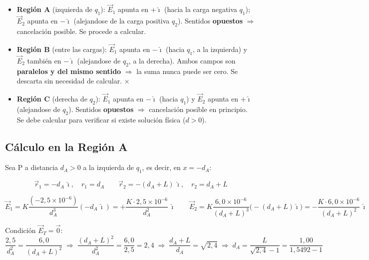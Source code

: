 \documentclass[12pt,letterpaper]{article}
\begin{document}
\begin{itemize}
    \item \textbf{Regi\'on A} (izquierda de $q_1$):
    $\vec{E}_1$ apunta en $+\hat{\imath}$ (hacia la carga negativa $q_1$);
    $\vec{E}_2$ apunta en $-\hat{\imath}$ (alejandose de la carga positiva $q_2$).
    Sentidos \textbf{opuestos} $\Rightarrow$ cancelaci\'on posible. Se procede a calcular.

    \item \textbf{Regi\'on B} (entre las cargas):
    $\vec{E}_1$ apunta en $-\hat{\imath}$ (hacia $q_1$, a la izquierda) y
    $\vec{E}_2$ tambi\'en en $-\hat{\imath}$ (alejandose de $q_2$, a la derecha).
    Ambos campos son \textbf{paralelos y del mismo sentido} $\Rightarrow$
    la suma nunca puede ser cero. Se descarta sin necesidad de calcular. $\times$

    \item \textbf{Regi\'on C} (derecha de $q_2$):
    $\vec{E}_1$ apunta en $-\hat{\imath}$ (hacia $q_1$) y
    $\vec{E}_2$ apunta en $+\hat{\imath}$ (alejandose de $q_2$).
    Sentidos \textbf{opuestos} $\Rightarrow$ cancelaci\'on posible en principio.
    Se debe calcular para verificar si existe soluci\'on f\'isica ($d>0$).
\end{itemize}

\subsection*{C\'alculo en la Regi\'on A}

Sea P a distancia $d_A > 0$ a la izquierda de $q_1$, es decir, en $x = -d_A$:

\[
    \vec{r}_1 = -d_A\,\hat{\imath},\quad r_1 = d_A \qquad
    \vec{r}_2 = -(d_A+L)\,\hat{\imath},\quad r_2 = d_A+L
\]

\[
    \vec{E}_1 = K\frac{(-2{,}5\times10^{-6})}{d_A^3}(-d_A\,\hat{\imath})
    = +\frac{K\cdot2{,}5\times10^{-6}}{d_A^2}\,\hat{\imath}
    \qquad
    \vec{E}_2 = K\frac{6{,}0\times10^{-6}}{(d_A+L)^3}\bigl(-(d_A+L)\hat{\imath}\bigr)
    = -\frac{K\cdot6{,}0\times10^{-6}}{(d_A+L)^2}\,\hat{\imath}
\]

Condici\'on $\vec{E}_T = \vec{0}$:
\[
    \frac{2{,}5}{d_A^2} = \frac{6{,}0}{(d_A+L)^2}
    \;\Rightarrow\;
    \frac{(d_A+L)^2}{d_A^2} = \frac{6{,}0}{2{,}5} = 2{,}4
    \;\Rightarrow\;
    \frac{d_A+L}{d_A} = \sqrt{2{,}4}
    \;\Rightarrow\;
    d_A = \frac{L}{\sqrt{2{,}4}-1} = \frac{1{,}00}{1{,}5492-1}
\]
\end{document}
